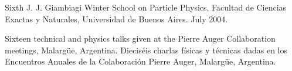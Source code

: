 \begin{etaremune}
\item {}Sixth J. J. Giambiagi Winter School on Particle Physics, Facultad de Ciencias Exactas y Naturales, Universidad de Buenos Aires. July 2004.

\item {} 
\ifeng
Sixteen technical and physics talks given at the Pierre Auger Collaboration meetings, Malargüe, Argentina.
\else
Dieciséis charlas físicas y técnicas dadas en los Encuentros Anuales de la Colaboración Pierre Auger, Malargüe, Argentina.
\fi
\end{etaremune}
